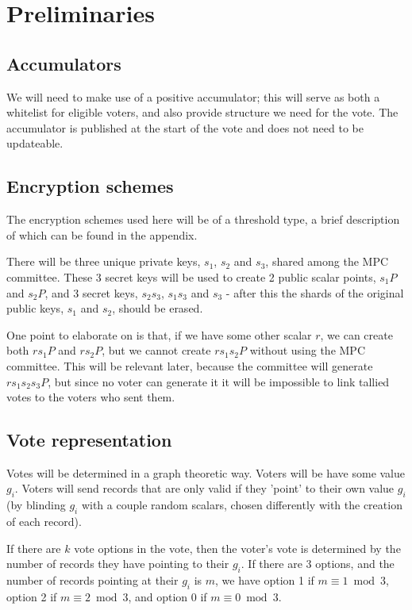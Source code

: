 \documentclass{article}
\begin{document}
\section{Preliminaries}
\subsection{Accumulators}
We will need to make use of a positive accumulator; this will serve as both a whitelist for eligible voters, and also provide structure we need for the vote. The accumulator is published at the start of the vote and does not need to be updateable.

\subsection{Encryption schemes}
The encryption schemes used here will be of a threshold type, a brief description of which can be found in the appendix.

There will be three unique private keys, $s_1$, $s_2$ and $s_3$, shared among the MPC committee. These 3 secret keys will be used to create 2 public scalar points, $s_1P$ and $s_2P$, and 3 secret keys, $s_2s_3$, $s_1s_3$ and $s_3$ - after this the shards of the original public keys, $s_1$ and $s_2$, should be erased.

One point to elaborate on is that, if we have some other scalar $r$, we can create both $rs_1P$ and $rs_2P$, but we cannot create $rs_1s_2P$ without using the MPC committee. This will be relevant later, because the committee will generate $rs_1s_2s_3P$, but since no voter can generate it it will be impossible to link tallied votes to the voters who sent them.

\subsection{Vote representation}
Votes will be determined in a graph theoretic way. Voters will be have some value $g_i$. Voters will send records that are only valid if they 'point' to their own value $g_i$ (by blinding $g_i$ with a couple random scalars, chosen differently with the creation of each record). 

If there are $k$ vote options in the vote, then the voter's vote is determined by the number of records they have pointing to their $g_i$. If there are 3 options, and the number of records pointing at their $g_i$ is $m$, we have option 1 if $m\equiv1\bmod3$, option 2 if $m\equiv2\bmod3$, and option 0 if $m\equiv0\bmod3$.
\end{document}
